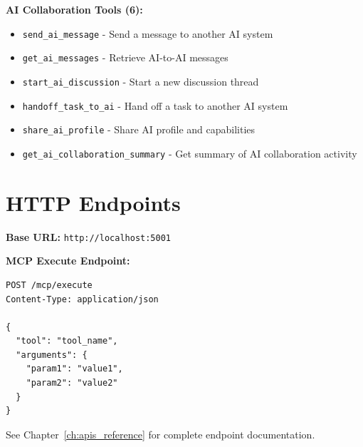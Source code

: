 \textbf{AI Collaboration Tools (6):}
\begin{itemize}
    \item \texttt{send\_ai\_message} - Send a message to another AI system
    \item \texttt{get\_ai\_messages} - Retrieve AI-to-AI messages
    \item \texttt{start\_ai\_discussion} - Start a new discussion thread
    \item \texttt{handoff\_task\_to\_ai} - Hand off a task to another AI system
    \item \texttt{share\_ai\_profile} - Share AI profile and capabilities
    \item \texttt{get\_ai\_collaboration\_summary} - Get summary of AI collaboration activity
\end{itemize}

\section*{HTTP Endpoints}

\textbf{Base URL:} \texttt{http://localhost:5001}

\textbf{MCP Execute Endpoint:}
\begin{verbatim}
POST /mcp/execute
Content-Type: application/json

{
  "tool": "tool_name",
  "arguments": {
    "param1": "value1",
    "param2": "value2"
  }
}
\end{verbatim}

See Chapter~\ref{ch:apis_reference} for complete endpoint documentation.

